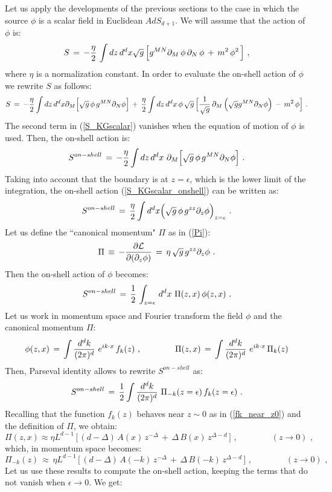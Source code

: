 \documentclass[12pt,notitlepage]{article}
\newcommand{\beq}{\begin{equation}}
\newcommand{\eeq}{\end{equation}}
\begin{document}
Let us apply the developments of the previous sections to the case in which the source $\phi$ is a scalar field in Euclidean $AdS_{d+1}$. We will assume that  the action of $\phi$ is:
\beq
S\,=\,-{\eta\over 2}\,\int dz\,d^d x\sqrt{g}\,\Big[
g^{MN}\partial_M\,\phi\,\partial_N\,\phi\,+\,m^2\,\phi^2\,\Big]\,\,,
\eeq
where $\eta$ is a normalization constant. In order to evaluate the on-shell action of $\phi$ we rewrite $S$ as follows:
\beq
S\,=\,-{\eta\over 2}\int dz\,d^d x \partial_{M} 
\Big[ \sqrt{g}\, \phi\, g^{MN}\partial_N\phi\Big]\,+\,
{\eta\over 2}\int dz\,d^d x\,\phi\,\sqrt{g}\,\Big[
{1\over \sqrt{g}}\,\partial_M\,\Big( \sqrt{g} g^{MN}\partial_N\phi\Big)\,-\,m^2\,\phi
\Big]\,\,.
\label{S_KGscalar}
\eeq
The second term  in (\ref{S_KGscalar}) vanishes when the equation of motion of $\phi$ is used. Then, the on-shell action is:
\beq
S^{on-shell}\,=\,-{\eta\over 2}\int dz\,d^d x \,\,\partial_{M} 
\Big[ \sqrt{g}\, \phi\, g^{MN}\partial_N\phi\Big]\,\,.
\label{S_KGscalar_onshell}
\eeq
Taking into account that the boundary is at $z=\epsilon$, which is the lower limit of the integration, the on-shell action (\ref{S_KGscalar_onshell}) can be written as:
\beq
S^{on-shell}\,=\,{\eta\over 2}\int d^d x \Big(\sqrt{g}\, \phi\, g^{zz}\partial_z\phi\Big)_{z=\epsilon}\,\,.
\eeq
Let us define the ``canonical momentum" $\Pi$ as in (\ref{Pi}):
\beq
\Pi\,\equiv\,-{\partial {\cal L}\over \partial (\partial_{z} \phi)}\,=\,
\eta\,\sqrt{g}\, g^{zz}\partial_z\phi\,\,.
\eeq
Then the on-shell action of $\phi$ becomes:
\beq
S^{on-shell}\,=\,{1\over 2}\,\int_{z=\epsilon}\,d^d x \,\,
\Pi(z,x)\,\phi(z,x)\,\,.
\eeq
Let us work in momentum space and  Fourier transform the field $\phi$ and the  canonical momentum $\Pi$:
\beq
\phi(z,x)\,=\,\int {d^dk\over (2\pi)^d}\,\,
e^{ik\cdot x}\, f_k(z)\,\,,
\qquad\qquad
\Pi(z,x)\,=\,\int {d^dk\over (2\pi)^d}\,\,
e^{ik\cdot x}\, \Pi_k(z)
\eeq
Then, Parseval identity allows to rewrite $S^{on-shell}$ as:
\beq
S^{on-shell}\,=\,{1\over 2}\int {d^dk\over (2\pi)^d}\,\,
\Pi_{-k}(z=\epsilon)\,f_k(z=\epsilon)\,\,.
\eeq
Recalling  that  the function $f_k(z)$ behaves near $z\sim 0$ as in (\ref{fk_near_z0}) and the definition of $\Pi$, we obtain:
\beq
\Pi(z,x)\approx\eta L^{d-1}\,
\Big[\,(d-\Delta)\,A(x)\,z^{-\Delta}\,+\,\Delta\, B(x)\, z^{\Delta-d}\,\Big]\,\,,
\qquad\qquad
(z\to 0)\,\,,
\eeq
which, in momentum space becomes:
\beq
\Pi_{-k}(z)\,\approx\,\eta L^{d-1}\,
\Big[\,(d-\Delta)\,A(-k)\,z^{-\Delta}\,+\,\Delta\, B(-k)\, z^{\Delta-d}\,\Big]\,\,,
\qquad\qquad
(z\to 0)\,\,,
\eeq
Let us use these results to compute the on-shell action, keeping the terms that do not vanish when $\epsilon\to 0$. We get:
\end{document}
